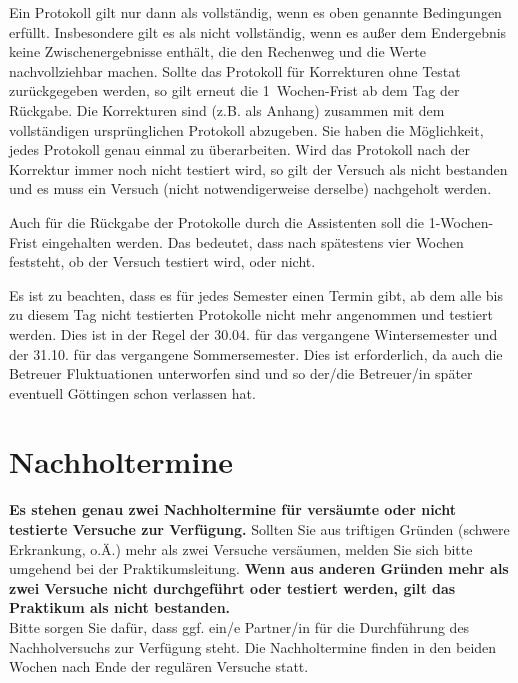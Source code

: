 Ein Protokoll gilt nur dann als vollständig, wenn es oben genannte Bedingungen erfüllt. Insbesondere gilt es als nicht vollständig, wenn es außer dem Endergebnis keine Zwischenergebnisse enthält, die den Rechenweg und die Werte nachvollziehbar machen. Sollte das Protokoll für Korrekturen ohne Testat zurückgegeben werden, so gilt erneut die 1~Wochen-Frist ab dem Tag der Rückgabe. Die Korrekturen sind (z.B. als Anhang) zusammen mit dem vollständigen ursprünglichen Protokoll abzugeben. Sie haben die Möglichkeit, jedes Protokoll genau einmal zu überarbeiten. Wird das Protokoll nach der Korrektur immer noch nicht testiert wird, so gilt der Versuch als nicht bestanden und es muss ein Versuch (nicht notwendigerweise derselbe) nachgeholt werden.

Auch für die Rückgabe der Protokolle durch die Assistenten soll die 1-Wochen-Frist eingehalten werden. Das bedeutet, dass nach spätestens vier Wochen feststeht, ob der Versuch testiert wird, oder nicht.

Es ist zu beachten, dass es für jedes Semester einen Termin gibt, ab dem alle bis zu diesem Tag nicht testierten Protokolle nicht mehr angenommen und testiert werden. Dies ist in der Regel der 30.04. für das vergangene Wintersemester und der 31.10. für das vergangene Sommersemester. Dies ist erforderlich, da auch die Betreuer Fluktuationen
unterworfen sind und so der/die Betreuer/in später eventuell Göttingen schon verlassen hat.

\section{Nachholtermine}

\textbf{Es stehen genau zwei Nachholtermine für versäumte oder nicht testierte Versuche zur Verfügung.} Sollten Sie aus triftigen Gründen (schwere Erkrankung, o.Ä.) mehr als zwei Versuche versäumen, melden Sie sich bitte umgehend bei der Praktikumsleitung. \textbf{Wenn aus anderen Gründen mehr als zwei Versuche nicht durchgeführt oder testiert werden, gilt das Praktikum als nicht bestanden.}\\
Bitte sorgen Sie dafür, dass ggf. ein/e Partner/in für die Durchführung des Nachholversuchs zur Verfügung steht. Die Nachholtermine finden in den beiden Wochen nach Ende der regulären Versuche statt.


